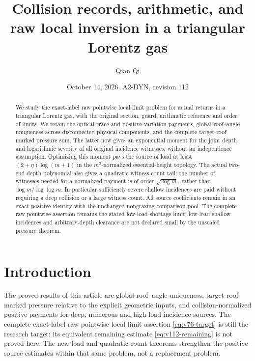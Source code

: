 \documentclass[11pt,reqno]{amsart}
\title[Collision records and raw local inversion]{Collision records, arithmetic, and raw local inversion in a triangular Lorentz gas}
\author{Qian Qi}
\date{October 14, 2026. A2-DYN, revision 112}
\numberwithin{equation}{section}
\theoremstyle{definition}\newtheorem{definition}[theorem]{Definition}
\theoremstyle{remark}\newtheorem{remark}[theorem]{Remark}
\begin{document}
\raggedbottom
\begin{abstract}
We study the exact-label raw pointwise local limit problem for actual
returns in a triangular Lorentz gas, with the original section,
guard, arithmetic reference and order of limits. We retain the
optical trace and positive variation payments, global roof--angle
uniqueness across disconnected physical components, and the complete
target-roof marked pressure sum. The latter now gives an exponential
moment for the joint depth and logarithmic severity of all original
incidence witnesses, without an independence assumption. Optimizing
this moment pays the source of load at least $(2+\eta)\log(m+1)$
in the $m^2$-normalized essential-height topology. The actual two-end
depth polynomial also gives a quadratic witness-count tail; the
number of witnesses needed for a normalized payment is of order
$\sqrt{\log m}$, rather than $\log m/\log\log m$. In particular
sufficiently severe shallow incidences are paid without requiring a
deep collision or a large witness count. All source coefficients
remain in an exact positive identity with the unchanged nongrazing
comparison pool. The complete raw pointwise assertion remains the
stated low-load-shortage limit; low-load shallow incidences and
arbitrary-depth clearance are not declared small by the unscaled
pressure theorem.
\end{abstract}
\maketitle

\section*{Introduction}
The proved results of this article are global roof--angle
uniqueness, target-roof marked pressure relative to the explicit
geometric inputs, and collision-normalized positive payments for
deep, numerous and high-load incidence sources. The complete
exact-label raw pointwise local limit assertion
\eqref{eq:v76-target} is still the research target: its equivalent
remaining estimate \eqref{eq:v112-remaining} is not proved here.
The new load and quadratic-count theorems strengthen the positive
source estimates within that same problem, not a replacement problem.
\end{document}
